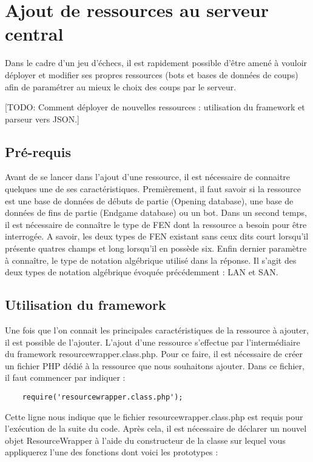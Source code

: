 \documentclass[a4paper,11pt]{article}
\begin{document}
\section{Ajout de ressources au serveur central}
         Dans le cadre d'un jeu d'échecs, il est rapidement possible d'être amené à vouloir déployer et modifier ses propres ressources (bots et bases de données de coups) afin de paramétrer au mieux le choix des coups par le serveur.
        
[TODO: Comment déployer de nouvelles ressources : utilisation du framework et parseur vers JSON.]

\subsection{Pré-requis}
	Avant de se lancer dans l'ajout d'une ressource, il est nécessaire de connaitre quelques une de ses caractéristiques. Premièrement, il faut savoir si la ressource est une base de données de débuts de partie (Opening database), une base de données de fins de partie (Endgame database) ou un bot. Dans un second temps, il est nécessaire de connaître le type de FEN dont la ressource a besoin pour être interrogée. A savoir, les deux types de FEN existant sans ceux dits court lorsqu'il présente quatres champs et long lorsqu'il en possède six. Enfin dernier paramètre à connaître, le type de notation algébrique utilisé dans la réponse. Il s'agit des deux types de notation algébrique évoquée précédemment : LAN et SAN.
	
     
\subsection{Utilisation du framework}
	Une fois que l'on connait les principales caractéristiques de la ressource à ajouter, il est possible de l'ajouter. L'ajout d'une ressource s'effectue par l'intermédiaire du framework resourcewrapper.class.php. Pour ce faire, il est nécessaire de créer un fichier PHP dédié à la ressource que nous souhaitons ajouter. Dans ce fichier, il faut commencer par indiquer : 
	\begin{lstlisting}
	require('resourcewrapper.class.php');
	\end{lstlisting} 
	Cette ligne nous indique que le fichier resourcewrapper.class.php est requis pour l'exécution de la suite du code. Après cela, il est nécessaire de déclarer un nouvel objet ResourceWrapper à l'aide du constructeur de la classe sur lequel vous appliquerez l'une des fonctions dont voici les prototypes :
\end{document}
